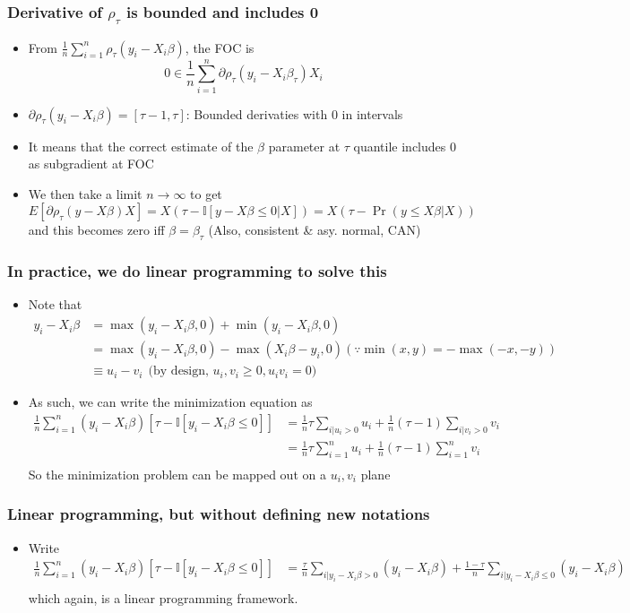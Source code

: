 \documentclass[aspectratio=169]{beamer}
\begin{document}
\begin{frame}
\frametitle{Derivative of $\rho_\tau$ is bounded and includes 0}
\begin{itemize}
\item From $\frac{1}{n}\sum_{i=1}^n \rho_\tau (y_i-X_i\beta)$, the FOC is 
\[
0\in \frac{1}{n}\sum_{i=1}^n\partial \rho_\tau (y_i-X_i\beta_\tau)X_i
\]
\item $\partial \rho_\tau (y_i-X_i\beta) =[\tau-1,\tau]$: Bounded derivaties with 0 in intervals
\item It means that the correct estimate of the $\beta$ parameter at $\tau$ quantile includes 0 as subgradient at FOC
\item We then take a limit $n\to\infty$ to get
\[
E[\partial \rho_\tau (y-X\beta)X] = X(\tau-\mathbb{I}[y-X\beta\leq0|X])=X(\tau-\Pr(y\leq X\beta|X))
\]
and this becomes zero iff $\beta=\beta_\tau$ (Also, consistent \& asy. normal, CAN)
\end{itemize}
\end{frame}

\begin{frame}
\frametitle{In practice, we do linear programming to solve this}
\begin{itemize}
\item Note that 
\[
\begin{aligned}
y_i - X_i\beta &=\max(y_i-X_i\beta,0)+\min(y_i-X_i\beta,0)\\ 
 &=\max(y_i-X_i\beta,0)-\max(X_i\beta-y_i,0) (\because \min(x,y)=-\max(-x,-y))\\ 
 &\equiv u_i-v_i \ \ \text{(by design, $u_i ,v_i\geq0, u_iv_i=0$)}
\end{aligned}
\]
\item As such, we can write the minimization equation as
\[
\begin{aligned}
\frac{1}{n}\sum_{i=1}^n (y_i-X_i\beta)[\tau-\mathbb{I}[y_i-X_i\beta\leq0]]&=\frac{1}{n}\tau\sum_{i|u_i>0}u_i+\frac{1}{n}(\tau-1)\sum_{i|v_i>0}v_i\\
&=\frac{1}{n}\tau\sum_{i=1}^nu_i+\frac{1}{n}(\tau-1)\sum_{i=1}^nv_i\\
\end{aligned}
\]
So the minimization problem can be mapped out on a $u_i, v_i$ plane
\end{itemize}
\end{frame}

\begin{frame}
\frametitle{Linear programming, but without defining new notations}
\begin{itemize}
\item Write 
\[
\begin{aligned}
\frac{1}{n}\sum_{i=1}^n (y_i-X_i\beta)[\tau-\mathbb{I}[y_i-X_i\beta\leq0]]&=\frac{\tau}{n}\sum_{i|y_i-X_i\beta>0}(y_i-X_i\beta)+\frac{1-\tau}{n}\sum_{i|y_i-X_i\beta\leq0}(y_i-X_i\beta)\\
\end{aligned}
\]
which again, is a linear programming framework.
\end{itemize}
\end{frame}
\end{document}
